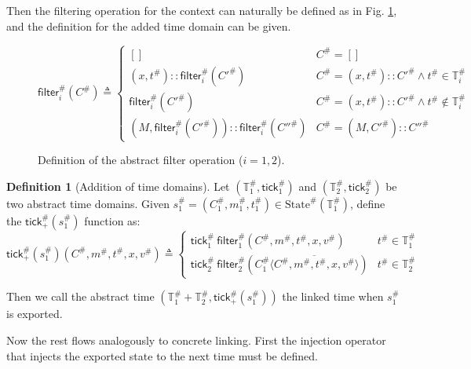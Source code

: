 \documentclass[acmsmall,review]{acmart}\settopmatter{printfolios=true,printccs=false,printacmref=false}
\theoremstyle{definition}
\newtheorem{definition}{Definition}[section]
\newcommand*{\cons}{::}
\newcommand*{\A}[1]{{#1}^{\#}}
\newcommand*{\Time}{\mathbb{T}}
\newcommand*{\ATime}{\A{\Time}}
\newcommand*{\mem}{m}
\newcommand*{\AState}[1]{\A{\text{State}}({#1})}
\newcommand*{\tick}{\mathsf{tick}}
\newcommand*{\delete}[2]{{#1}\overline{\langle{#2}\rangle}}
\newcommand*{\filter}{\mathsf{filter}}
\begin{document}
Then the filtering operation for the context can naturally be defined as in Fig. \ref{fig:absfilter}, and the definition for the added time domain can be given.
\begin{figure}[h!]
  \footnotesize
  \[
    \A\filter_i(\A{C})\triangleq
    \begin{cases}
      []                                               & \A{C}=[]                                                \\
      (x,\A{t})\cons\A\filter_i(\A{C'})                & \A{C}=(x,\A{t})\cons \A{C'}\wedge \A{t}\in\A\Time_i     \\
      \A\filter_i(\A{C'})                              & \A{C}=(x,\A{t})\cons \A{C'}\wedge \A{t}\not\in\A\Time_i \\
      (M,\A\filter_i(\A{C'}))\cons\A\filter_i(\A{C''}) & \A{C}=(M, \A{C'})\cons \A{C''}
    \end{cases}
  \]
  \caption{Definition of the abstract filter operation ($i=1,2$).}
  \label{fig:absfilter}
\end{figure}

\begin{definition}[Addition of time domains]
  Let $(\ATime_1,\A\tick_1)$ and $(\ATime_2,\A\tick_2)$ be two abstract time domains.
  Given $\A{s}_1=(\A{C}_1,\A\mem_1,\A{t}_1)\in\AState{\ATime_1}$, define the $\A{\tick}_+(\A{s}_1)$ function as:
  \[
    \A\tick_{+}(\A{s}_1)(\A{C},\A\mem,\A{t},x,\A{v})\triangleq
    \begin{cases}
      \A{\tick}_1\:\A\filter_1(\A{C},\A\mem,\A{t},x,\A{v})                   & \A{t}\in\ATime_1 \\
      \A{\tick}_2\:\A\filter_2(\delete{\A{C}_1}{\A{C},\A\mem,\A{t},x,\A{v}}) & \A{t}\in\ATime_2
    \end{cases}
  \]

  Then we call the abstract time $(\ATime_1+\ATime_2,\A\tick_{+}(\A{s}_1))$ the linked time when $\A{s}_1$ is exported.
\end{definition}

Now the rest flows analogously to concrete linking.
First the injection operator that injects the exported state to the next time must be defined.
\end{document}
